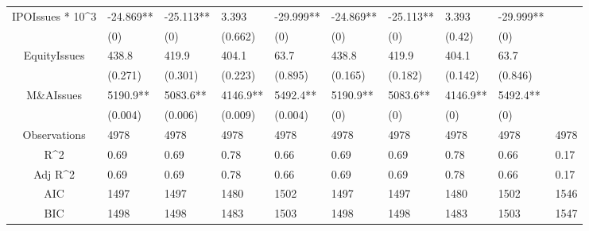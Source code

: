 \documentclass{article}
\begin{document}
\begin{table}[H]
\begin{tabular}{|clllllllll|}
  IPOIssues * 10^3 & -24.869** & -25.113** & 3.393 & -29.999** & -24.869** & -25.113** & 3.393 & -29.999** &  \\ 
   & (0) & (0) & (0.662) & (0) & (0) & (0) & (0.42) & (0) &  \\ 
  EquityIssues & 438.8 & 419.9 & 404.1 & 63.7 & 438.8 & 419.9 & 404.1 & 63.7 &  \\ 
   & (0.271) & (0.301) & (0.223) & (0.895) & (0.165) & (0.182) & (0.142) & (0.846) &  \\ 
  M\&AIssues & 5190.9** & 5083.6** & 4146.9** & 5492.4** & 5190.9** & 5083.6** & 4146.9** & 5492.4** &  \\ 
   & (0.004) & (0.006) & (0.009) & (0.004) & (0) & (0) & (0) & (0) &  \\ 
  \hline 
 Observations & 4978 & 4978 & 4978 & 4978 & 4978 & 4978 & 4978 & 4978 & 4978 \\ 
  R^2 & 0.69 & 0.69 & 0.78 & 0.66 & 0.69 & 0.69 & 0.78 & 0.66 & 0.17 \\ 
  Adj R^2 & 0.69 & 0.69 & 0.78 & 0.66 & 0.69 & 0.69 & 0.78 & 0.66 & 0.17 \\ 
  AIC & 1497 & 1497 & 1480 & 1502 & 1497 & 1497 & 1480 & 1502 & 1546 \\ 
  BIC & 1498 & 1498 & 1483 & 1503 & 1498 & 1498 & 1483 & 1503 & 1547 \\ 
   \hline
\end{tabular}
 
\end{table}
\end{document}
